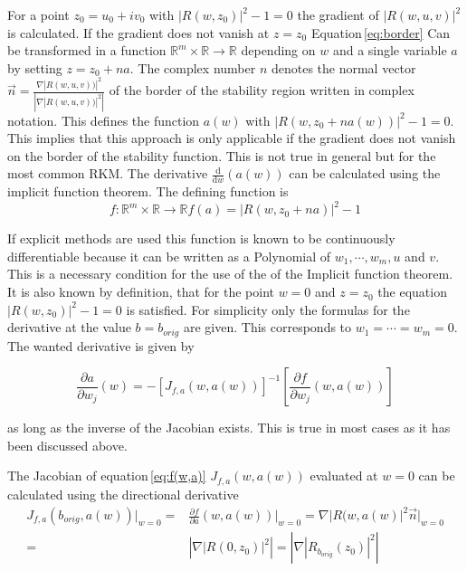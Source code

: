 \documentclass{article}
\begin{document}
For a point $z_0= u_0 +i v_0 $ 
with $ |R(w,z_0)|^2 -1 = 0 $ the gradient of
 $|R(w,u,v)|^2$ is calculated. 
If the gradient does not vanish at $z = z_0$ Equation\,\ref{eq:border} Can be transformed in a function $\mathbb{R}^m \times \mathbb{R} \rightarrow \mathbb{R}$ depending on $w$ and a single variable $a$ by setting $z = z_0 + n a$. The complex number $n$ denotes the normal vector $\vec{n} = \frac{\nabla |R(w,u,v))|^2}{\left| \nabla |R(w,u,v))|^2 \right|}$ of the border of the stability region written in complex notation. This defines the function $a(w)$ with $|R(w,z_0 + n a(w))|^2 -1 = 0$. 
This implies that this approach is only applicable if the gradient does not vanish on the border of the stability function. This is not true in general but for the most common RKM.
The derivative $\frac{\mathrm d}{\mathrm d w} (a(w))$ can be calculated using the implicit function theorem. The defining function is 
\begin{equation}\label{eq:f(w,a)}
f: \mathbb{R}^m \times \mathbb{R} \rightarrow \mathbb{R} f(a) = |R(w,z_0 + n a)|^2 -1 
\end{equation}

If explicit methods are used this function is known to be continuously differentiable because it can be written as a Polynomial of $w_1,\cdots,w_m,u$ and $v$. This is a necessary condition for the use of the of the Implicit function theorem. 
It is also known by definition, that for the point $w=0$ and $z = z_0$ the equation $ |R(w,z_0)|^2 -1 = 0 $ is satisfied.
For simplicity only the formulas for the derivative at the value $b = b_{orig}$ are given. This corresponds to $w_1 = \cdots = w_m = 0$.
The wanted derivative  is given by 

\begin{equation}
 \frac{\partial a}{\partial w_j} (w) =
 - \left[ J_{f,a}(w,a(w))  \right] ^{-1} 
   \left[ \frac{\partial f}{\partial w_j}(w,a(w)) \right]
\end{equation}

as long as the inverse of the Jacobian exists. This is true in most cases as it has been discussed above.

The Jacobian of equation\,\ref{eq:f(w,a)} $J_{f,a}(w,a(w))$ evaluated at $w=0$ can be calculated using the directional derivative
\begin{align*}
 J_{f,a}(b_{orig},a(w)) \Big|_{w=0} =& 
 \frac{\partial f}{\partial a} (w,a(w)) \Big|_{w=0} = 
 \nabla |R(w,a(w)|^2 \vec{n} \Big|_{w=0} \\
=& \left| \nabla|R(0,z_0)|^2 \right| = \left| \nabla|R_{b_{orig}}(z_0)|^2 \right|
\end{align*} 
\end{document}
